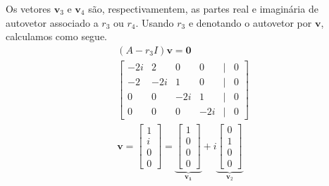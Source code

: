 \begin{resol}
\begin{enumerate}[a)]
    Os vetores $\pmb{v}_3$ e $\pmb{v}_4$ são, respectivamentem, as partes real e imaginária de autovetor associado a $r_3$ ou $r_4$. Usando $r_3$ e denotando o autovetor por $\pmb{v}$, calculamos como segue.
    \begin{gather}
      (A-r_3I)\pmb{v} = \pmb{0} \\
      \begin{bmatrix}
        -2i & 2 & 0 & 0 & | & 0 \\
        -2 & -2i & 1 & 0 & | & 0 \\
        0 & 0 & -2i & 1 & | & 0 \\
        0 & 0 & 0 & -2i & | & 0
      \end{bmatrix}\\
      \pmb{v} =
      \begin{bmatrix}
        1 \\
        i \\
        0 \\
        0
      \end{bmatrix} =
      \underbrace{\begin{bmatrix}
        1 \\
        0 \\
        0 \\
        0
      \end{bmatrix}}_{\pmb{v_1}} + i
    \underbrace{\begin{bmatrix}
        0 \\
        1 \\
        0 \\
        0
      \end{bmatrix}}_{\pmb{v}_2}
    \end{gather}
  \end{enumerate}


\end{resol}
